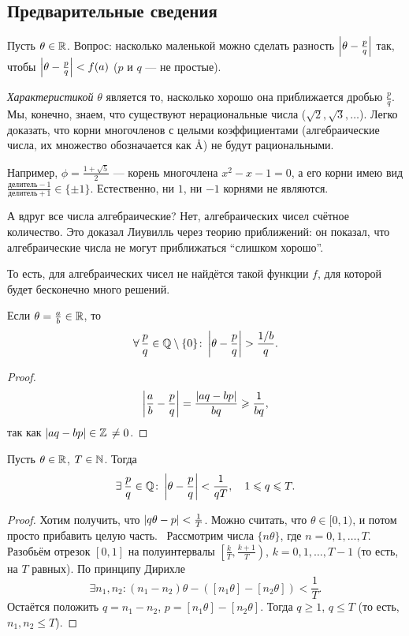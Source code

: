 \subsection{Предварительные сведения}
\label{subsec:III-1}

Пусть $\theta \in \mathbb{R}$. Вопрос: насколько маленькой можно сделать разность $\left| \theta - \frac{p}{q} \right|$ так, чтобы $\left| \theta - \frac{p}{q} \right| < f(a)$ ($p$ и $q$ --- не простые).

\emph{Характеристикой} $\theta$ является то, насколько хорошо она приближается дробью $\frac{p}{q}$. Мы, конечно, знаем, что существуют нерациональные числа ($\sqrt{2}, \sqrt{3}, \dots$). Легко доказать, что корни многочленов с целыми коэффициентами (алгебраические числа, их множество обозначается как \AA) не будут рациональными.

Например, $\phi = \frac{1 + \sqrt{5}}{2}$ --- корень многочлена $x^2 - x - 1 = 0$, а его корни имею вид $\frac{\text{делитель} - 1}{\text{делитель} + 1} \in \{ \pm 1 \}$. Естественно, ни $1$, ни $-1$ корнями не являются.

А вдруг все числа алгебраические? Нет, алгебраических чисел счётное количество. Это доказал Лиувилль через теорию приближений: он показал, что алгебраические числа не могут приближаться ``слишком хорошо''.

То есть, для алгебраических чисел не найдётся такой функции $f$, для которой будет бесконечно много решений.

\begin{nstatement}
\label{stm:III-1}
    Если $\theta = \frac{a}{b} \in \mathbb{R}$, то
    \[
        \forall \frac{p}{q} \in \QQ \setminus \{ 0 \}\colon \abs{\theta - \frac{p}{q}} > \frac{\sfrac{1}{b}}{q}.
    \]
\end{nstatement}
\begin{proof}
    \[
        \left| \frac{a}{b} - \frac{p}{q} \right| = \frac{\left| aq - bp \right|}{bq} \geqslant \frac{1}{bq},
    \] 
    так как $\left| aq - bp \right| \in \mathbb{Z}\, \ne 0$.
\end{proof}

\begin{ntheorem}
\label{thm:III-1}
    Пусть $\theta \in \mathbb{R}$, $T \in \mathbb{N}$. Тогда
    \[
        \exists \frac{p}{q} \in \QQ\colon \abs{\theta - \frac{p}{q}} < \frac{1}{qT},
        \quad
        1 \le q \le T.
    \]
\end{ntheorem}
\begin{proof}
    Хотим получить, что $\left| q\theta - p \right| < \frac{1}{T}$. Можно считать, что $\theta \in [0, 1)$, и потом просто прибавить целую часть.~\newline
    Рассмотрим числа $\{ n\theta \}$, где $n = 0, 1, \dots, T$. Разобьём отрезок $[0, 1]$ на полуинтервалы $\left[ \frac{k}{T}, \frac{k+1}{T} \right)$, $k = 0, 1, \dots, T-1$ (то есть, на $T$ равных). По принципу Дирихле
    \[
        \exists n_1, n_2\colon 
        \left( n_1 - n_2 \right)\theta - \left( \left[ n_1\theta \right] - \left[ n_2\theta \right] \right) < 
        \frac{1}{T}.
    \]
    Остаётся положить $q = n_1 - n_2$, $p = \left[ n_1\theta \right] - \left[ n_2\theta \right]$. Тогда $q \ge 1$, $q \le T$ (то есть, $n_1, n_2 \le T$).
\end{proof}

